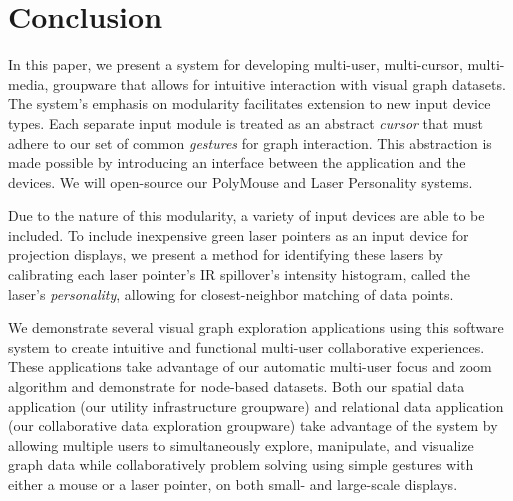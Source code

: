 \documentclass[runningheads,a4paper]{llncs}
\begin{document}
\vspace{-0.1in}

\section{Conclusion}

\vspace{-0.1in}



In this paper, we 
present
a system for developing multi-user,
multi-cursor, multi-media, groupware that allows for intuitive
interaction with visual graph datasets.  The system's emphasis on
modularity facilitates extension to 
new input device types.
Each separate input
module is treated as an abstract {\em cursor} that must adhere to
our set of common {\em gestures} for graph interaction.  This
abstraction is made possible by introducing an interface
between the application and the devices.
We will 
open-source
our PolyMouse and Laser Personality systems.

Due to the nature of this modularity, a variety of input devices are
able to be included. 
To include inexpensive green laser pointers as an 
input device for
projection displays, we 
present
a method for identifying
these lasers
by calibrating each laser pointer's IR spillover's intensity
histogram, called the laser's \emph{personality}, allowing for
closest-neighbor matching of data points. 

We 
demonstrate
several visual graph exploration applications using this software
system to create intuitive and functional multi-user collaborative
experiences.  These applications take advantage of our 
automatic multi-user focus
and zoom 
algorithm
and demonstrate for
node-based
datasets.  Both our spatial data application (our utility
infrastructure groupware) and relational data application (our
collaborative data exploration groupware) take advantage of the system
by allowing multiple users to simultaneously explore, manipulate, and
visualize graph data while collaboratively problem solving using
simple gestures with either a mouse or a laser pointer, on both small-
and large-scale displays.
\end{document}
